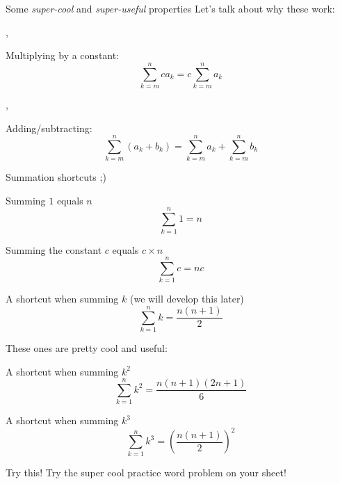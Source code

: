 	\begin{namedframe}{Some \emph{super-cool} and \emph{super-useful} properties}
		Let's talk about why these work:

		\sep

		Multiplying by a constant:
		\[\sum_{k=m}^{n}ca_k = c\sum_{k=m}^{n}a_k\]

		\sep

		Adding/subtracting:
		\[\sum_{k=m}^{n}(a_k + b_k) = \sum_{k=m}^{n}a_k + \sum_{k=m}^{n}b_k\]
	\end{namedframe}
	\begin{namedbreakframe}{Summation shortcuts ;)}
		\begin{block}{Summing $1$ equals $n$}
			\[\sum_{k=1}^{n}1 = n\]
		\end{block}
		\begin{block}{Summing the constant $c$ equals $c \times n$}
			\[\sum_{k=1}^{n}c = nc\]
		\end{block}
		\framebreak
		\begin{alertblock}{A shortcut when summing $k$ (we will develop this later)}
			\[\sum_{k=1}^{n}k = \frac{n(n+1)}{2}\]
		\end{alertblock}
		\framebreak
		These ones are pretty cool and useful:
		\begin{block}{A shortcut when summing $k^2$}
			\[\sum_{k=1}^{n}k^2 = \frac{n(n+1)(2n+1)}{6}\]
		\end{block}
		\begin{block}{A shortcut when summing $k^3$}
			\[\sum_{k=1}^{n}k^3 = \left(\frac{n(n+1)}{2}\right)^2\]
		\end{block}
	\end{namedbreakframe}
	\begin{namedframe}{Try this!}
		\Huge
		Try the super cool practice word problem on your sheet!
	\end{namedframe}
